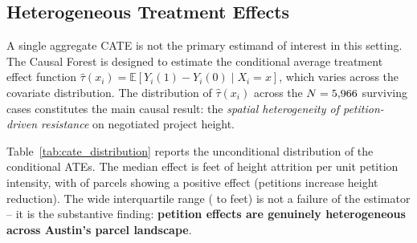 \documentclass[11pt, letterpaper, oneside]{article}
\begin{document}
\subsection{Heterogeneous Treatment Effects}
\label{sec:hte}

A single aggregate CATE is not the primary estimand of interest in this setting. The Causal Forest is designed to estimate the conditional average treatment effect function $\hat{\tau}(x_i) = \mathbb{E}[Y_i(1) - Y_i(0) \mid X_i = x]$, which varies across the covariate distribution. The distribution of $\hat{\tau}(x_i)$ across the $N=5{,}966{}$ surviving cases constitutes the main causal result: the \emph{spatial heterogeneity of petition-driven resistance} on negotiated project height.

Table~\ref{tab:cate_distribution} reports the unconditional distribution of the conditional ATEs. The median effect is \metricCATEHeightMedian{} feet of height attrition per unit petition intensity, with \metricCATEHeightPctPositive{} of parcels showing a positive effect (petitions increase height reduction). The wide interquartile range (\metricCATEHeightQuartileLow{} to \metricCATEHeightQuartileHigh{} feet) is not a failure of the estimator -- it is the substantive finding: \textbf{petition effects are genuinely heterogeneous across Austin's parcel landscape}.
\end{document}

